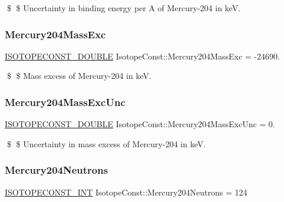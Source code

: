 \$ \$ Uncertainty in binding energy per A of Mercury-\/204 in keV. \mbox{\label{group___isotope_const-_mercury-_hg204_ga4de6b578b3f449bab760bcad294b31fe}} 
\subsubsection{\texorpdfstring{Mercury204\+Mass\+Exc}{Mercury204MassExc}}
{\footnotesize\ttfamily \mbox{\hyperlink{group___isotope_const-_macros_ga8f45a7272ce02c0b4c65c44636ed719a}{I\+S\+O\+T\+O\+P\+E\+C\+O\+N\+S\+T\+\_\+\+D\+O\+U\+B\+LE}} Isotope\+Const\+::\+Mercury204\+Mass\+Exc = -\/24690.}

\$ \$ Mass excess of Mercury-\/204 in keV. \mbox{\label{group___isotope_const-_mercury-_hg204_ga0e52731996a4cb1b989f3f5358e4719c}} 
\subsubsection{\texorpdfstring{Mercury204\+Mass\+Exc\+Unc}{Mercury204MassExcUnc}}
{\footnotesize\ttfamily \mbox{\hyperlink{group___isotope_const-_macros_ga8f45a7272ce02c0b4c65c44636ed719a}{I\+S\+O\+T\+O\+P\+E\+C\+O\+N\+S\+T\+\_\+\+D\+O\+U\+B\+LE}} Isotope\+Const\+::\+Mercury204\+Mass\+Exc\+Unc = 0.}

\$ \$ Uncertainty in mass excess of Mercury-\/204 in keV. \mbox{\label{group___isotope_const-_mercury-_hg204_ga34d12cb196ab67c979186ad89ba26d76}} 
\subsubsection{\texorpdfstring{Mercury204\+Neutrons}{Mercury204Neutrons}}
{\footnotesize\ttfamily \mbox{\hyperlink{group___isotope_const-_macros_ga5f18360b3e99483a35c32d789e62621c}{I\+S\+O\+T\+O\+P\+E\+C\+O\+N\+S\+T\+\_\+\+I\+NT}} Isotope\+Const\+::\+Mercury204\+Neutrons = 124}

